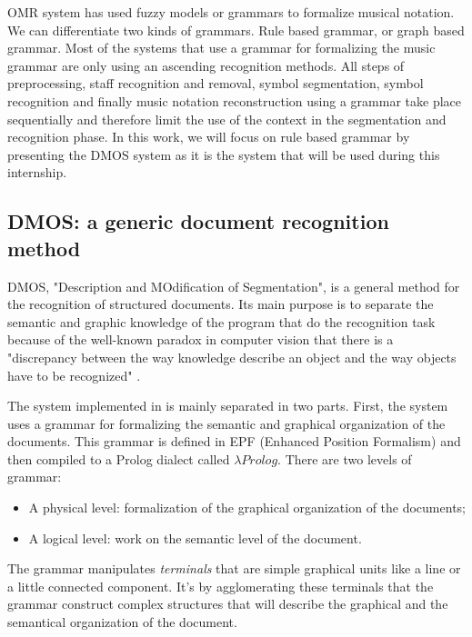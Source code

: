 \documentclass[11pt]{sdm}
\begin{document}
OMR system has used fuzzy models or grammars to formalize musical notation.
We can differentiate two kinds of grammars.
Rule based grammar, or graph based grammar.
Most of the systems that use a grammar for formalizing the music grammar are only using an ascending recognition methods.
All steps of preprocessing, staff recognition and removal, symbol segmentation, symbol recognition and finally music notation reconstruction using a grammar take place sequentially and therefore limit the use of the context in the segmentation and recognition phase.
In this work, we will focus on rule based grammar by presenting the DMOS system \cite{couasnon_dmos_2001} as it is the system that will be used during this internship.

\subsection{DMOS: a generic document recognition method}

DMOS, "Description and MOdification of Segmentation", is a general method for the recognition of structured documents.
Its main purpose is to separate the semantic and graphic knowledge of the program that do the recognition task because of the well-known paradox in computer vision that there is a "discrepancy between the way knowledge describe an object and the way objects have to be recognized" \cite{couasnon_dmos_2001}.

The system implemented in \cite{couasnon_dmos_2001} is mainly separated in two parts.
First, the system uses a grammar for formalizing the semantic and graphical organization of the documents.
This grammar is defined in EPF (Enhanced Position Formalism) and then compiled to a Prolog dialect called $\lambda Prolog$.
There are two levels of grammar:
\begin{itemize}
  \item A physical level: formalization of the graphical organization of the documents;
  \item A logical level: work on the semantic level of the document.
\end{itemize}
The grammar manipulates \textit{terminals} that are simple graphical units like a line or a little connected component.
It’s by agglomerating these terminals that the grammar construct complex structures that will describe the graphical and the semantical organization of the document.
\end{document}
